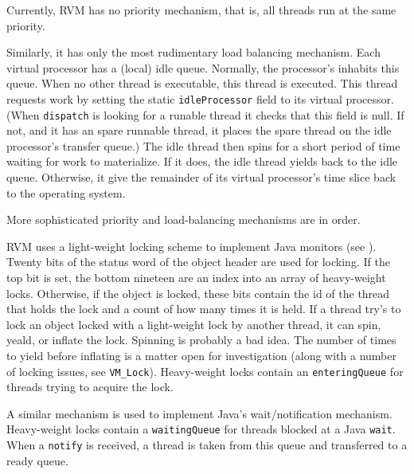 Currently, RVM has no priority mechanism, that is, all threads run
at the same priority.

Similarly, it has only the most rudimentary load balancing mechanism.
Each virtual processor has a (local) idle queue.  Normally, the
processor's 
inhabits this queue.  When no other
thread is executable, this thread is executed.  This thread requests
work by setting the static {\tt idleProcessor} field to its virtual
processor.  (When {\tt dispatch} is looking for a runable thread it
checks that this field is null.  If not, and it has an spare runnable
thread, it places the spare thread on the idle processor's transfer
queue.)  The idle thread then spins for a short period of time waiting
for work to materialize.  If it does, the idle thread yields back to
the idle queue.  Otherwise, it give the remainder of its virtual
processor's time slice back to the operating system.

More sophisticated priority and load-balancing mechanisms are in
order.

RVM uses a light-weight locking scheme to implement Java monitors (see
).  Twenty bits of the status word of the object header are
used for locking.  If the top bit is set, the bottom nineteen are an
index into an array of heavy-weight locks.  Otherwise, if the object
is locked, these bits contain the id of the thread that holds the lock
and a count of how many times it is held.  If a thread try's to lock
an object locked with a light-weight lock by another thread, it can
spin, yeald, or inflate the lock.  Spinning is probably a bad idea.
The number of times to yield before inflating is a matter open for
investigation (along with a number of locking issues, see {\tt VM\_Lock}).
Heavy-weight locks contain an {\tt enteringQueue} for threads trying
to acquire the lock.

A similar mechanism is used to implement Java's wait/notification
mechanism.  Heavy-weight locks contain a {\tt waitingQueue} for
threads blocked at a Java {\tt wait}.  When a {\tt notify} is
received, a thread is taken from this queue and transferred to a ready
queue.
